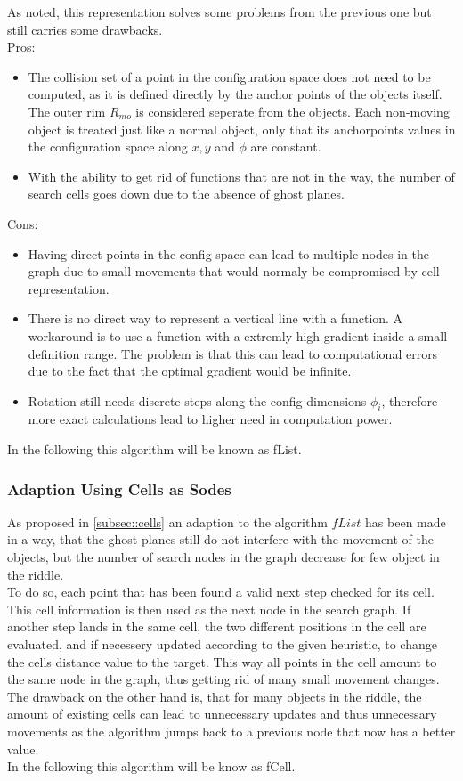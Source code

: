 As noted, this representation solves some problems from the previous one but still carries some drawbacks.\\
Pros:
\begin{itemize}
\item The collision set of a point in the configuration space does not need to be computed, as it is defined directly by the anchor points of the objects itself. The outer rim $R_{mo}$ is considered seperate from the objects. Each non-moving object is treated just like a normal object, only that its anchorpoints values in the configuration space along $x,y$ and $\phi$ are constant.
\item With the ability to get rid of functions that are not in the way, the number of search cells goes down due to the absence of ghost planes.
\end{itemize}
Cons:
\begin{itemize}
\item Having direct points in the config space can lead to multiple nodes in the graph due to small movements that would normaly be compromised by cell representation.
\item There is no direct way to represent a vertical line with a function. A workaround is to use a function with a extremly high gradient inside a small definition range.
The problem is that this can lead to computational errors due to the fact that the optimal gradient would be infinite.
\item Rotation still needs discrete steps along the config dimensions $\phi_i$, therefore more exact calculations lead to higher need in computation power.
\end{itemize}

In the following this algorithm will be known as fList.

\subsubsection{Adaption Using Cells as Sodes}
As proposed in \ref{subsec::cells} an adaption to the algorithm $fList$ has been made in a way, that the ghost planes still do not interfere with the movement of the objects, but the number of search nodes in the graph decrease for few object in the riddle.\\
To do so, each point that has been found a valid next step checked for its cell. This cell information is then used as the next node in the search graph. If another step lands in the same cell, the two different positions in the cell are evaluated, and if necessery updated according to the given heuristic, to change the cells distance value to the target. This way all points in the cell amount to the same node in the graph, thus getting rid of many small movement changes.\\
The drawback on the other hand is, that for many objects in the riddle, the amount of existing cells can lead to unnecessary updates and thus unnecessary movements as the algorithm jumps back to a previous node that now has a better value.\\ 
In the following this algorithm will be know as fCell.
